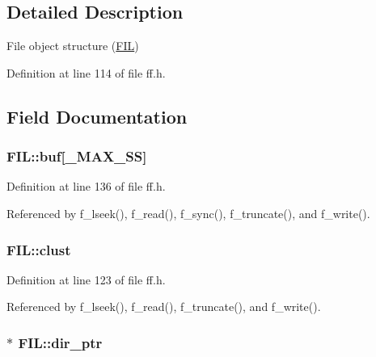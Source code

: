 \subsection{Detailed Description}
File object structure (\hyperlink{structFIL}{F\-I\-L}) 

Definition at line 114 of file ff.\-h.



\subsection{Field Documentation}
\hypertarget{structFIL_a7a95fb86588663e48309b5cded7e207b}{
\subsubsection[{buf}]{ F\-I\-L\-::buf\mbox{[}{\bf \-\_\-\-M\-A\-X\-\_\-\-S\-S}\mbox{]}}}\label{structFIL_a7a95fb86588663e48309b5cded7e207b}


Definition at line 136 of file ff.\-h.



Referenced by f\-\_\-lseek(), f\-\_\-read(), f\-\_\-sync(), f\-\_\-truncate(), and f\-\_\-write().

\hypertarget{structFIL_aa41312aba551b9a6d1c9d3c8c7d2734b}{
\subsubsection[{clust}]{ F\-I\-L\-::clust}}\label{structFIL_aa41312aba551b9a6d1c9d3c8c7d2734b}


Definition at line 123 of file ff.\-h.



Referenced by f\-\_\-lseek(), f\-\_\-read(), f\-\_\-truncate(), and f\-\_\-write().

\hypertarget{structFIL_a5af9e9fb312b629220eaf684dd28c4a9}{
\subsubsection[{dir\-\_\-ptr}]{$\ast$ F\-I\-L\-::dir\-\_\-ptr}}\label{structFIL_a5af9e9fb312b629220eaf684dd28c4a9}


